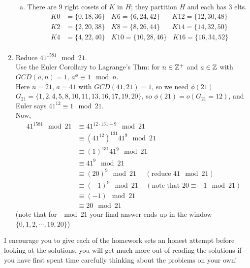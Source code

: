 \begin{enumerate}
\begin{enumerate}[a)]
    \item There are $9$ right cosets of $K$ in $H$; they partition $H$ and each has $3$ elts. 
    \begin{align*}
        K0 &= \{0, 18, 36\} \ \ \ \ K6 = \{6, 24,42\} \ \ \ \ \ \ \ \ K12 = \{12, 30, 48\}   \\
        K2 &= \{2, 20, 38\} \ \ \ \ K8 = \{8, 26, 44\} \ \ \ \ \ \ \ \ K14 = \{14, 32, 50\}  \\
        K4 &= \{4, 22, 40\} \ \ \ \ K10 = \{10, 28, 46\} \ \ \ \ K16 = \{16, 34, 52\}  \\
    \end{align*}
\end{enumerate}
\item Reduce $41^{1581} \mod 21$. \\
Use the Euler Corollary to Lagrange's Thm: for $n\in {\mathbb{ Z}}^+$ and $a\in {\mathbb{ Z}}$ with $GCD(a,n)=1$, $a^{\phi} \equiv 1 \mod n$. \\ 

Here $n=21$, $a=41$ with $GCD(41,21)=1$, so we need $\phi(21)$ \\

$G_{21}= \{1,2,4,5,8,10,11,13,16,17,19,20\}$, so $\phi(21)=o(G_{21}=12)$, and Euler says $41^{12}\equiv 1 \mod 21$. \\

Now,
\begin{align*}
    41^{1581}\mod 21 &\equiv 41^{12\cdot 131 + 9} \mod 21 \\ 
    &\equiv (41^{12})^{131}41^{9} \mod 21 \\
    &\equiv (1)^{131}41^{9} \mod 21 \\
    &\equiv 41^9 \mod 21 \\
    &\equiv (20)^9 \mod 21 \ \ \ \ \ \ (\text{reduce }41 \mod 21) \\
    &\equiv (-1)^{9}\mod 21 \ \ \ \ \ (\text{note that }20 \equiv -1 \mod 21) \\
    &\equiv (-1) \mod 21 \\
    &\equiv 20 \mod 21 
\end{align*}
(note that for $\mod 21$ your final answer ends up in the window $\{0,1,2,\cdots, 19, 20\}$)
\end{enumerate}
\newpage

\begin{tcolorbox}
    I encourage you to give each of the homework sets an honest attempt before looking at the solutions, you will get much more out of reading the solutions if you have first spent time carefully thinking about the problems on your own!
\end{tcolorbox}
\vspace{-0.2in}

